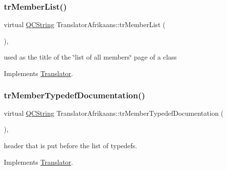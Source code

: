 \mbox{\label{class_translator_afrikaans_a7f2c4e84058e1c5edc89c2f580d01938}} 
\subsubsection{\texorpdfstring{trMemberList()}{trMemberList()}}
{\footnotesize\ttfamily virtual \mbox{\hyperlink{class_q_c_string}{Q\+C\+String}} Translator\+Afrikaans\+::tr\+Member\+List (\begin{DoxyParamCaption}{ }\end{DoxyParamCaption})\hspace{0.3cm}{\ttfamily [inline]}, {\ttfamily [virtual]}}

used as the title of the \char`\"{}list of all members\char`\"{} page of a class 

Implements \mbox{\hyperlink{class_translator}{Translator}}.

\mbox{\label{class_translator_afrikaans_ada7c239c5ee583e64396154eefcb24f9}} 
\subsubsection{\texorpdfstring{trMemberTypedefDocumentation()}{trMemberTypedefDocumentation()}}
{\footnotesize\ttfamily virtual \mbox{\hyperlink{class_q_c_string}{Q\+C\+String}} Translator\+Afrikaans\+::tr\+Member\+Typedef\+Documentation (\begin{DoxyParamCaption}{ }\end{DoxyParamCaption})\hspace{0.3cm}{\ttfamily [inline]}, {\ttfamily [virtual]}}

header that is put before the list of typedefs. 

Implements \mbox{\hyperlink{class_translator}{Translator}}.

\mbox{\label{class_translator_afrikaans_ac20a33c0eb2006367a01204255919e86}} 
